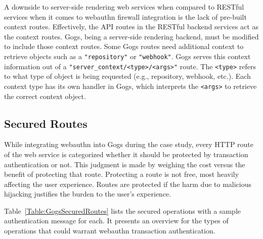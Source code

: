 A downside to server-side rendering web services when compared to RESTful services when it comes to webauthn firewall integration is the lack of pre-built context routes. Effectively, the API routes in the RESTful backend services act as the context routes. Gogs, being a server-side rendering backend, must be modified to include those context routes. Some Gogs routes need additional context to retrieve objects such as a \lstinline{"repository"} or \lstinline{"webhook"}. Gogs serves this context information out of a \lstinline{"server_context/<type>/<args>"} route. The \lstinline{<type>} refers to what type of object is being requested (e.g., repository, webhook, etc.). Each context type has its own handler in Gogs, which interprets the \lstinline{<args>} to retrieve the correct context object.


\subsection{Secured Routes}

While integrating webauthn into Gogs during the case study, every HTTP route of the web service is categorized whether it should be protected by transaction authentication or not. This judgment is made by weighing the cost versus the benefit of protecting that route. Protecting a route is not free, most heavily affecting the user experience. Routes are protected if the harm due to malicious hijacking justifies the burden to the user's experience.

Table~\ref{Table:GogsSecuredRoutes} lists the secured operations with a sample authentication message for each. It presents an overview for the types of operations that could warrant webauthn transaction authentication.

